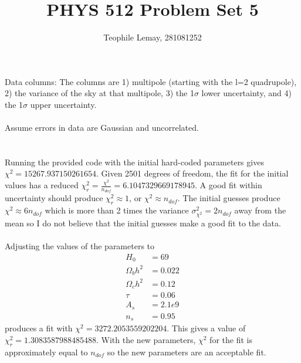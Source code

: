 \documentclass{article}
\title{PHYS 512 Problem Set 5}
\author{Teophile Lemay, 281081252}
\date{}
\newcommand{\<}[1]{\left\langle #1 \right\rangle }
\begin{document}
\maketitle

Data columns: The columns are 1) multipole
(starting with the l=2 quadrupole), 2) the variance of the sky at that multipole, 3) the 1$\sigma$ lower uncertainty, and 4) the 1$\sigma$ upper uncertainty.\\
\\
Assume errors in data are Gaussian and uncorrelated.

\section{}
Running the provided code with the initial hard-coded parameters gives $\chi^2 = 15267.937150261654$. Given 2501  degrees of freedom, the fit for the initial values has a reduced $\chi^2_{r} = \frac{\chi^2}{n_{dof}} = 6.1047329669178945$. A good fit within uncertainty should produce $\chi^2_r \approx 1$, or $\chi^2 \approx n_{dof}$. The initial guesses produce $\chi^2 \approx 6n_{dof}$ which is more than 2 times the variance $\sigma^2_{\chi^2} = 2n_{dof}$ away from the mean so I do not believe that the initial guesses make a good fit to the data.\\
\\
Adjusting the values of the parameters to 
\begin{align*}
	H_0 &= 69\\
	\Omega_b h^2 &= 0.022\\
	\Omega_c h^2 &= 0.12\\
	\tau &= 0.06\\
	A_s &= 2.1e9\\
	n_s &= 0.95
\end{align*}
produces a fit with $\chi^2 = 3272.2053559202204$. This gives a value of $\chi^2_r = 1.3083587988485488$. With the new parameters, $\chi^2$ for the fit is approximately equal to $n_{dof}$ so the new parameters are an acceptable fit.
\end{document}
